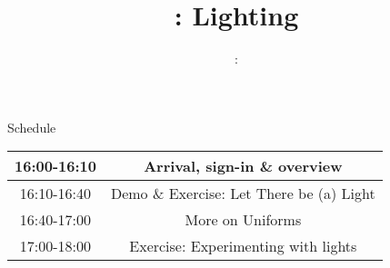 \usepackage{../../beamerthemeFalmouthGamesAcademy}
\usepackage{multimedia}
\graphicspath{ {../../} }




\usepackage[normalem]{ulem}
\usepackage{wasysym}

\usepackage{pdfpages}

\usepackage{caption}
\captionsetup[figure]{font=scriptsize,labelfont=scriptsize}

\usetikzlibrary{arrows,automata}




\title{\sessionnumber: Lighting}
\subtitle{\modulecode: \moduletitle}

\frame{\titlepage} 





\begin{frame}{Schedule}
	\begin{center}
		\begin{tabular}{|c c|}
			\hline
			16:00-16:10 & Arrival, sign-in \& overview \\
			\hline
			16:10-16:40 & Demo \& Exercise: Let There be (a) Light \\
			\hline
			16:40-17:00 & More on Uniforms \\
			17:00-18:00 & Exercise: Experimenting with lights \\
			\hline
		\end{tabular}
	\end{center}
\end{frame}




